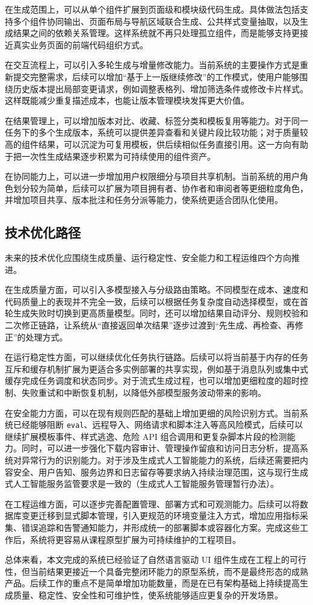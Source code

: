 在生成范围上，可以从单个组件扩展到页面级和模块级代码生成。具体做法包括支持多个组件协同输出、页面布局与导航区域联合生成、公共样式变量抽取，以及生成结果之间的依赖关系管理。这样系统就不再只处理孤立组件，而是能够支持更接近真实业务页面的前端代码组织方式。

在交互流程上，可以引入多轮生成与增量修改能力。当前系统的主要操作方式是重新提交完整需求，后续可以增加“基于上一版继续修改”的工作模式，使用户能够围绕历史版本提出局部变更请求，例如调整表格列、增加筛选条件或修改卡片样式。这样既能减少重复描述成本，也能让版本管理模块发挥更大价值。

在结果管理上，可以增加版本对比、收藏、标签分类和模板复用等能力。对于同一任务下的多个生成版本，系统可以提供差异查看和关键片段比较功能；对于质量较高的组件结果，可以沉淀为可复用模板，供后续相似任务直接引用。这一方向有助于把一次性生成结果逐步积累为可持续使用的组件资产。

在协同能力上，可以进一步增加用户权限细分与项目共享机制。当前系统的用户角色划分较为简单，后续可以扩展为项目拥有者、协作者和审阅者等更细粒度角色，并增加项目共享、版本批注和任务分派等能力，使系统更适合团队化使用。

\subsection{技术优化路径}
未来的技术优化应围绕生成质量、运行稳定性、安全能力和工程运维四个方向推进。

在生成质量方面，可以引入多模型接入与分级路由策略。不同模型在成本、速度和代码质量上的表现并不完全一致，后续可以根据任务复杂度自动选择模型，或在首轮生成失败时切换到更高质量模型。同时，还可以增加结果自动评分、规则校验和二次修正链路，让系统从“直接返回单次结果”逐步过渡到“先生成、再检查、再修正”的处理方式。

在运行稳定性方面，可以继续优化任务执行链路。后续可以将当前基于内存的任务互斥和缓存机制扩展为更适合多实例部署的共享实现，例如基于消息队列或集中式缓存完成任务调度和状态同步。对于流式生成过程，也可以增加更细粒度的超时控制、失败重试和中断恢复机制，以降低外部模型服务波动带来的影响。

在安全能力方面，可以在现有规则匹配的基础上增加更细的风险识别方式。当前系统已经能够阻断 \texttt{eval}、远程导入、网络请求和脚本注入等高风险模式，后续可以继续扩展模板事件、样式逃逸、危险 API 组合调用和更复杂脚本片段的检测能力。同时，可以进一步强化下载内容审计、管理操作留痕和访问日志分析，提高系统对异常行为的识别能力。对于涉及生成式人工智能能力的系统，后续还需要把内容安全、用户告知、服务边界和日志留存等要求纳入持续治理范围，这与现行生成式人工智能服务监管要求是一致的（生成式人工智能服务管理暂行办法）\cite{cac2023_genai}。

在工程运维方面，可以逐步完善配置管理、部署方式和可观测能力。后续可以将数据库变更迁移到显式脚本管理，引入更规范的环境变量注入方式，增加应用指标采集、错误追踪和告警通知能力，并形成统一的部署脚本或容器化方案。完成这些工作后，系统将更容易从课程原型扩展为可持续维护的工程项目。

总体来看，本文完成的系统已经验证了自然语言驱动 UI 组件生成在工程上的可行性，但当前结果更接近一个具备完整闭环能力的原型系统，而不是最终形态的成熟产品。后续工作的重点不是简单增加功能数量，而是在已有架构基础上持续提高生成质量、稳定性、安全性和可维护性，使系统能够适应更复杂的开发场景。

